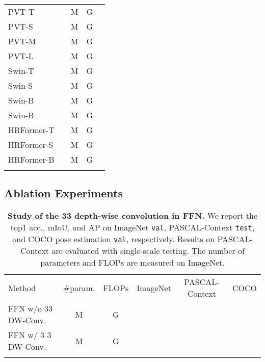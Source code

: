 \documentclass{article}
\begin{document}
\begin{table}[h]
\begin{tabular}{l|ccc|c}
    PVT-T~\cite{wang2021pyramid}                  &  & M  & G   &        \\
    PVT-S~\cite{wang2021pyramid}                  &  & M  & G   &        \\
    PVT-M~\cite{wang2021pyramid}                  &  & M  & G   &        \\
    PVT-L~\cite{wang2021pyramid}                  &  & M  & G   &        \\ \hline
    Swin-T~\cite{liu2021swin}                     &  & M    & G   &        \\
    Swin-S~\cite{liu2021swin}                     &  & M    & G   &        \\
    Swin-B~\cite{liu2021swin}                     &  & M    & G  &      \\
    Swin-B~\cite{liu2021swin}                     &  & M    & G    &   \\ \hline
    HRFormer-T                                    &  & M   & G   &        \\
    HRFormer-S                                    &  & M  & G   &        \\
    HRFormer-B                                    &  & M  & G  &        \\
    \shline
  \end{tabular}
\end{table}


\subsection{Ablation Experiments}



\begin{table}[h]
  \footnotesize
  \centering
  \setlength{\tabcolsep}{10pt}
  \renewcommand{\arraystretch}{1.3}
  \caption{\label{tab:comp_HRFormer}\textbf{Study
      of the 33 depth-wise convolution in FFN.}
    We report the top1 acc., mIoU, and AP on ImageNet \texttt{val}, PASCAL-Context \texttt{test}, and COCO pose estimation \texttt{val}, respectively.
    Results on PASCAL-Context are evaluated with single-scale testing.
    The number of parameters and FLOPs are measured on ImageNet.
  }
  {
    \begin{tabular}{l|cc|ccc}
      \shline
      {Method}                    & \#param. & FLOPs   & {ImageNet} & {PASCAL-Context} & {COCO}  \\
      \shline
      FFN w/o 33 DW-Conv. & M   & G &     &           &  \\
      FFN w/ 3 3 DW-Conv. & M   & G &     &           &  \\
      \shline
    \end{tabular}
  }
\end{table}
\end{document}
